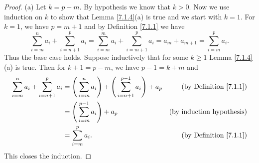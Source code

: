 \begin{proof}{(a)}
    Let \(k = p - m\).
    By hypothesis we know that \(k > 0\).
    Now we use induction on \(k\) to show that Lemma \ref{7.1.4}(a) is true and we start with \(k = 1\).
    For \(k = 1\), we have \(p = m + 1\) and by Definition \ref{7.1.1} we have
    \[
        \sum_{i = m}^n a_i + \sum_{i = n + 1}^p a_i = \sum_{i = m}^m a_i + \sum_{i = m + 1}^p a_i = a_m + a_{m + 1} = \sum_{i = m}^p a_i.
    \]
    Thus the base case holds.
    Suppose inductively that for some \(k \geq 1\) Lemma \ref{7.1.4}(a) is true.
    Then for \(k + 1 = p - m\), we have \(p - 1 = k + m\) and
    \begin{align*}
        \sum_{i = m}^n a_i + \sum_{i = n + 1}^p a_i & = \Bigg(\sum_{i = m}^n a_i\Bigg) + \Bigg(\sum_{i = n + 1}^{p - 1} a_i\Bigg) + a_p & \text{(by Definition \ref{7.1.1})} \\
                                                    & = \Bigg(\sum_{i = m}^{p - 1} a_i\Bigg) + a_p                                      & \text{(by induction hypothesis)}   \\
                                                    & = \sum_{i = m}^p a_i.                                                             & \text{(by Definition \ref{7.1.1})}
    \end{align*}
    This closes the induction.
\end{proof}

